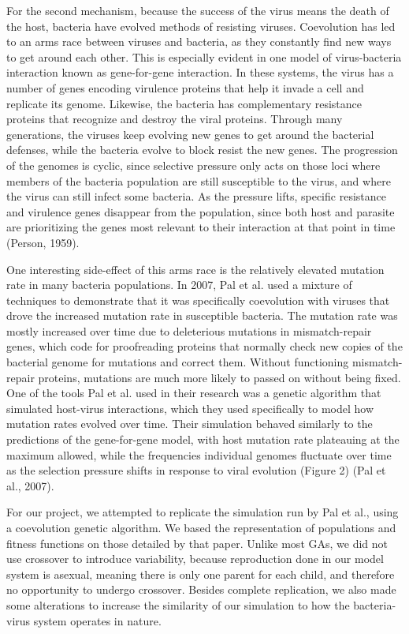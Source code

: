\documentclass[11pt, oneside]{article}
\begin{document}
For the second mechanism, because the success of the virus means the death of the host, bacteria have evolved methods of resisting viruses. Coevolution has led to an arms race between viruses and bacteria, as they constantly find new ways to get around each other. This is especially evident in one model of virus-bacteria interaction known as gene-for-gene interaction. In these systems, the virus has a number of genes encoding virulence proteins that help it invade a cell and replicate its genome. Likewise, the bacteria has complementary resistance proteins that recognize and destroy the viral proteins. Through many generations, the viruses keep evolving new genes to get around the bacterial defenses, while the bacteria evolve to block resist the new genes. The progression of the genomes is cyclic, since selective pressure only acts on those loci where members of the bacteria population are still susceptible to the virus, and where the virus can still infect some bacteria. As the pressure lifts, specific resistance and virulence genes disappear from the population, since both host and parasite are prioritizing the genes most relevant to their interaction at that point in time (Person, 1959).

One interesting side-effect of this arms race is the relatively elevated mutation rate in many bacteria populations. In 2007, Pal et al. used a mixture of techniques to demonstrate that it was specifically coevolution with viruses that drove the increased mutation rate in susceptible bacteria. The mutation rate was mostly increased over time due to deleterious mutations in mismatch-repair genes, which code for proofreading proteins that normally check new copies of the bacterial genome for mutations and correct them. Without functioning mismatch-repair proteins, mutations are much more likely to passed on without being fixed. One of the tools Pal et al. used in their research was a genetic algorithm that simulated host-virus interactions, which they used specifically to model how mutation rates evolved over time. Their simulation behaved similarly to the predictions of the gene-for-gene model, with host mutation rate plateauing at the maximum allowed, while the frequencies individual genomes fluctuate over time as the selection pressure shifts in response to viral evolution (Figure 2) (Pal et al., 2007).

For our project, we attempted to replicate the simulation run by Pal et al., using a coevolution genetic algorithm. We based the representation of populations and fitness functions on those detailed by that paper. Unlike most GAs, we did not use crossover to introduce variability, because reproduction done in our model system is asexual, meaning there is only one parent for each child, and therefore no opportunity to undergo crossover. Besides complete replication, we also made some alterations to increase the similarity of our simulation to how the bacteria-virus system operates in nature. 
\end{document}
